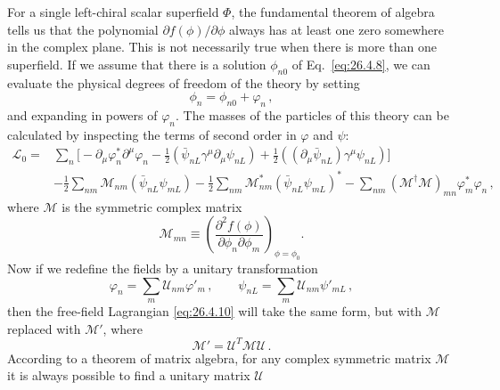 For a single left-chiral scalar superfield \(\Phi\), the fundamental theorem
of algebra tells us that the polynomial \(\partial f(\phi)/\partial\phi\)
always has at least one zero somewhere in the complex plane. This is not
necessarily true when there is more than one superfield. If we assume that
there is a solution \(\phi_{n0}\) of Eq.~\eqref{eq:26.4.8}, we can evaluate the
physical degrees of freedom of the theory by setting
\begin{equation}
  \phi_n=\phi_{n0}+\varphi_n\,,
  \tag{26.4.9}\label{eq:26.4.9}
\end{equation}
and expanding in powers of \(\varphi_n\). The masses of the particles of this
theory can be calculated by inspecting the terms of second order in
\(\varphi\) and \(\psi\):
\begin{equation}
  \begin{aligned}
  \mathcal{L}_0={}&
  \sum_n\biggl[
    -\partial_\mu\varphi_n^*\partial^\mu\varphi_n
    -\frac12(\bar\psi_{nL}\gamma^\mu\partial_\mu\psi_{nL})
    +\frac12((\partial_\mu\bar\psi_{nL})\gamma^\mu\psi_{nL})
  \biggr]
  \\
  &-\frac12\sum_{nm}\mathcal{M}_{nm}(\bar\psi_{nL}\psi_{mL})
  -\frac12\sum_{nm}\mathcal{M}_{nm}^*
    (\bar\psi_{nL}\psi_{mL})^*
  -\sum_{nm}(\mathcal{M}^\dagger\mathcal{M})_{mn}
    \varphi_m^*\varphi_n\,,
  \end{aligned}
  \tag{26.4.10}\label{eq:26.4.10}
\end{equation}
where \(\mathcal{M}\) is the symmetric complex matrix
\begin{equation}
  \mathcal{M}_{mn}\equiv
  \left(
    \frac{\partial^2f(\phi)}{\partial\phi_n\partial\phi_m}
  \right)_{\phi=\phi_0}.
  \tag{26.4.11}\label{eq:26.4.11}
\end{equation}
Now if we redefine the fields by a unitary transformation
\begin{equation}
  \varphi_n=\sum_m\mathcal{U}_{nm}\varphi'_m\,,
  \qquad
  \psi_{nL}=\sum_m\mathcal{U}_{nm}\psi'_{mL}\,,
  \tag{26.4.12}\label{eq:26.4.12}
\end{equation}
then the free-field Lagrangian \eqref{eq:26.4.10} will take the same form, but
with \(\mathcal{M}\) replaced with \(\mathcal{M}'\), where
\begin{equation}
  \mathcal{M}'=\mathcal{U}^T\mathcal{M}\mathcal{U}\,.
  \tag{26.4.13}\label{eq:26.4.13}
\end{equation}
According to a theorem of matrix algebra, for any complex symmetric matrix
\(\mathcal{M}\) it is always possible to find a unitary matrix \(\mathcal{U}\)

